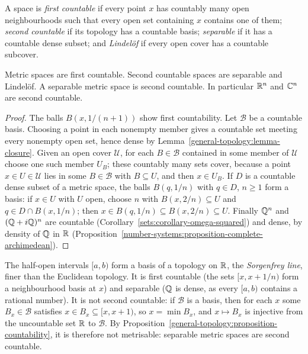 \begin{definition}\label{general-topology:definition-countability}
A space is \emph{first countable} if every point $x$ has countably many open neighbourhoods such that every open set containing $x$
contains one of them; \emph{second countable} if its topology has a countable basis; \emph{separable} if it has a countable dense subset;
and \emph{Lindel\"of} if every open cover has a countable subcover.
\end{definition}

\begin{proposition}\label{general-topology:proposition-countability}
Metric spaces are first countable. Second countable spaces are separable and Lindel\"of. A separable metric space is second countable.
In particular $\mathbb{R}^n$ and $\mathbb{C}^n$ are second countable.
\end{proposition}

\begin{proof}
The balls $B(x, 1/(n+1))$ show first countability. Let $\mathcal{B}$ be a countable basis. Choosing a point in each nonempty member gives a
countable set meeting every nonempty open set, hence dense by Lemma~\ref{general-topology:lemma-closure}. Given an open cover $\mathcal{U}$,
for each $B \in \mathcal{B}$ contained in some member of $\mathcal{U}$ choose one such member $U_B$; these countably many sets cover, because a
point $x \in U \in \mathcal{U}$ lies in some $B \in \mathcal{B}$ with $B \subseteq U$, and then $x \in U_B$. If $D$ is a countable dense subset of a metric space,
the balls $B(q, 1/n)$ with $q \in D$, $n \geq 1$ form a basis: if $x \in U$ with $U$ open, choose $n$ with $B(x, 2/n) \subseteq U$ and $q \in D \cap B(x, 1/n)$;
then $x \in B(q, 1/n) \subseteq B(x, 2/n) \subseteq U$. Finally $\mathbb{Q}^n$ and $(\mathbb{Q} + i\mathbb{Q})^n$ are countable
(Corollary~\ref{sets:corollary-omega-squared}) and dense, by density of $\mathbb{Q}$ in $\mathbb{R}$
(Proposition~\ref{number-systems:proposition-complete-archimedean}).
\end{proof}

\begin{counterexample}\label{general-topology:counterexample-sorgenfrey}
The half-open intervals $[a, b)$ form a basis of a topology on $\mathbb{R}$, the \emph{Sorgenfrey line}, finer than the Euclidean topology. It is first countable (the sets $[x, x + 1/n)$ form a neighbourhood basis at $x$) and separable
($\mathbb{Q}$ is dense, as every $[a, b)$ contains a rational number). It is not second countable: if $\mathcal{B}$ is a basis, then for each $x$ some $B_x \in \mathcal{B}$ satisfies $x \in B_x \subseteq [x, x + 1)$, so $x = \min B_x$, and $x \mapsto B_x$ is
injective from the uncountable set $\mathbb{R}$ to $\mathcal{B}$. By Proposition~\ref{general-topology:proposition-countability}, it is therefore not metrisable: separable metric spaces are second countable.
\end{counterexample}

